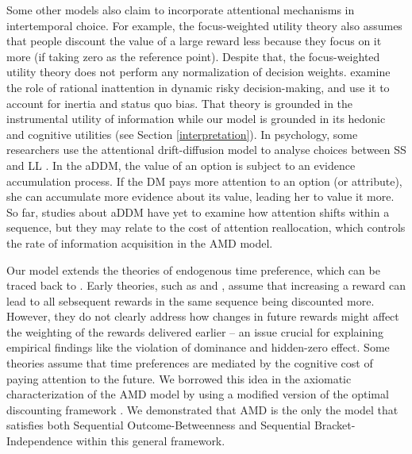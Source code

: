 \documentclass[
  12pt,
]{article}
\begin{document}
Some other models also claim to incorporate attentional mechanisms in
intertemporal choice. For example, the focus-weighted utility theory
\citep{kHoszegi2013model} also assumes that people discount the value of
a large reward less because they focus on it more (if taking zero as the
reference point). Despite that, the focus-weighted utility theory does
not perform any normalization of decision weights.
\citet{steiner2017rational} examine the role of rational inattention in
dynamic risky decision-making, and use it to account for inertia and
status quo bias. That theory is grounded in the instrumental utility of
information while our model is grounded in its hedonic and cognitive
utilities (see Section \ref{interpretation}). In psychology, some
researchers use the attentional drift-diffusion model
\citep[aDDM, see][]{krajbich2010visual} to analyse choices between SS
and LL \citep{amasino2019amount}. In the aDDM, the value of an option is
subject to an evidence accumulation process. If the DM pays more
attention to an option (or attribute), she can accumulate more evidence
about its value, leading her to value it more. So far, studies about
aDDM have yet to examine how attention shifts within a sequence, but
they may relate to the cost of attention reallocation, which controls
the rate of information acquisition in the AMD model.

Our model extends the theories of endogenous time preference, which can
be traced back to \citet{uzawa1968time}. Early theories, such as
\citet{uzawa1968time} and \citet{becker1997endogenous}, assume that
increasing a reward can lead to all sebsequent rewards in the same
sequence being discounted more. However, they do not clearly address how
changes in future rewards might affect the weighting of the rewards
delivered earlier -- an issue crucial for explaining empirical findings
like the violation of dominance and hidden-zero effect. Some theories
\citep[e.g.][]{fudenberg2006dual,noor2022optimal} assume that time
preferences are mediated by the cognitive cost of paying attention to
the future. We borrowed this idea in the axiomatic characterization of
the AMD model by using a modified version of the optimal discounting
framework \citep{noor2022optimal,noor2024constrained}. We demonstrated
that AMD is the only the model that satisfies both Sequential
Outcome-Betweenness and Sequential Bracket-Independence within this
general framework.
\end{document}
